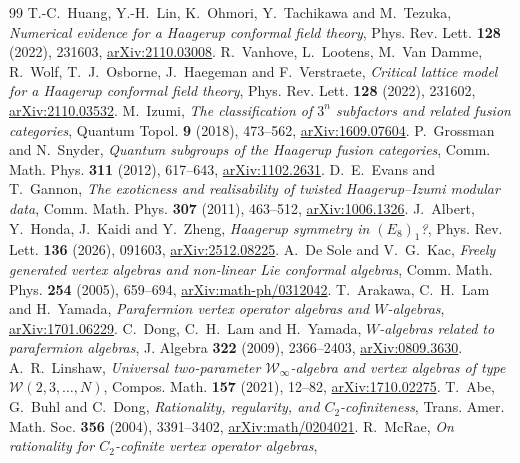 \begin{thebibliography}{99}\small
\setlength{\itemsep}{1pt}
T.-C.~Huang, Y.-H.~Lin, K.~Ohmori, Y.~Tachikawa and M.~Tezuka,
\emph{Numerical evidence for a Haagerup conformal field theory},
Phys. Rev. Lett. \textbf{128} (2022), 231603,
\href{https://arxiv.org/abs/2110.03008}{arXiv:2110.03008}.
R.~Vanhove, L.~Lootens, M.~Van Damme, R.~Wolf, T.~J.~Osborne,
J.~Haegeman and F.~Verstraete, \emph{Critical lattice model for a
Haagerup conformal field theory}, Phys. Rev. Lett. \textbf{128}
(2022), 231602,
\href{https://arxiv.org/abs/2110.03532}{arXiv:2110.03532}.
M.~Izumi, \emph{The classification of $3^n$ subfactors and related fusion
categories}, Quantum Topol. \textbf{9} (2018), 473--562,
\href{https://arxiv.org/abs/1609.07604v2}{arXiv:1609.07604}.
P.~Grossman and N.~Snyder, \emph{Quantum subgroups of the Haagerup fusion
categories}, Comm. Math. Phys. \textbf{311} (2012), 617--643,
\href{https://arxiv.org/abs/1102.2631}{arXiv:1102.2631}.
D.~E.~Evans and T.~Gannon, \emph{The exoticness and realisability of twisted
Haagerup--Izumi modular data}, Comm. Math. Phys. \textbf{307} (2011),
463--512, \href{https://arxiv.org/abs/1006.1326}{arXiv:1006.1326}.
J.~Albert, Y.~Honda, J.~Kaidi and Y.~Zheng, \emph{Haagerup symmetry in
$(E_8)_1$?}, Phys. Rev. Lett. \textbf{136} (2026), 091603,
\href{https://arxiv.org/abs/2512.08225v2}{arXiv:2512.08225}.
A.~De Sole and V.~G.~Kac, \emph{Freely generated vertex algebras and
non-linear Lie conformal algebras}, Comm. Math. Phys. \textbf{254}
(2005), 659--694, \href{https://arxiv.org/abs/math-ph/0312042}{arXiv:math-ph/0312042}.
T.~Arakawa, C.~H.~Lam and H.~Yamada, \emph{Parafermion vertex operator
algebras and $W$-algebras},
\href{https://arxiv.org/abs/1701.06229}{arXiv:1701.06229}.
C.~Dong, C.~H.~Lam and H.~Yamada, \emph{$W$-algebras related to parafermion
algebras}, J. Algebra \textbf{322} (2009), 2366--2403,
\href{https://arxiv.org/abs/0809.3630}{arXiv:0809.3630}.
A.~R.~Linshaw, \emph{Universal two-parameter $\mathcal W_\infty$-algebra and
vertex algebras of type $\mathcal W(2,3,\ldots,N)$}, Compos. Math.
\textbf{157} (2021), 12--82,
\href{https://arxiv.org/abs/1710.02275}{arXiv:1710.02275}.
T.~Abe, G.~Buhl and C.~Dong, \emph{Rationality, regularity, and
$C_2$-cofiniteness}, Trans. Amer. Math. Soc. \textbf{356} (2004),
3391--3402, \href{https://arxiv.org/abs/math/0204021}{arXiv:math/0204021}.
R.~McRae, \emph{On rationality for $C_2$-cofinite vertex operator algebras},

\end{thebibliography}
